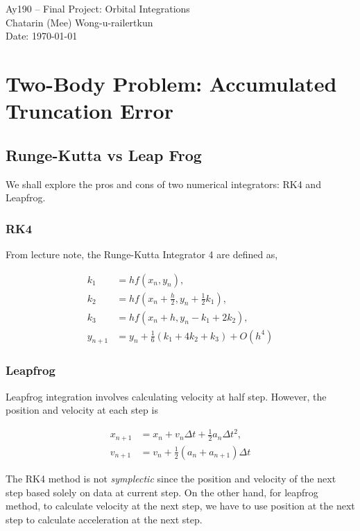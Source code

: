 \documentclass[11pt,letterpaper]{article}
\begin{document}
\begin{center}
\Large
Ay190 -- Final Project: Orbital Integrations \\
Chatarin (Mee) Wong-u-railertkun \\
Date: \today
\end{center}

\section{Two-Body Problem: Accumulated Truncation Error}

\subsection{Runge-Kutta vs Leap Frog}

We shall explore the pros and cons of two numerical integrators: RK4 and Leapfrog.

\subsubsection{RK4}
From lecture note, the Runge-Kutta Integrator 4 are defined as, 

\begin{align*}
k_1 &= hf(x_n,y_n), \\
k_2 &= hf(x_n+\frac{h}{2},y_n+\frac{1}{2}k_1), \\
k_3 &= hf(x_n+h, y_n-k_1+2k_2), \\
y_{n+1} &= y_n + \frac{1}{6}(k_1+4k_2+k_3)+O(h^4)
\end{align*}

\subsubsection{Leapfrog}
Leapfrog integration involves calculating velocity at half step. However, the position and velocity at each step is

\begin{align*}
x_{n+1} &= x_n + v_n \Delta t + \frac{1}{2} a_n \Delta t^2, \\
v_{n+1} &= v_n + \frac{1}{2} (a_n + a_{n+1}) \Delta t
\end{align*}	

The RK4 method is not \emph{symplectic} since the position and velocity of the next step based solely on data at current step. On the other hand, for leapfrog method, to calculate velocity at the next step, we have to use position at the next step to calculate acceleration at the next step.
\end{document}
